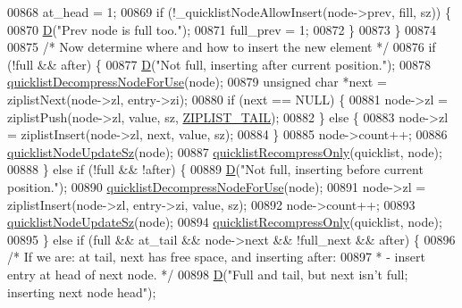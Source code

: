 \begin{DoxyCode}
{{{{{00868         at\_head = 1;
00869         \textcolor{keywordflow}{if} (!\_quicklistNodeAllowInsert(node->prev, fill, sz)) \{
00870             \hyperlink{debugmacro_8h_a74021f021dcdfbb22891787b79c5529d}{D}(\textcolor{stringliteral}{"Prev node is full too."});
00871             full\_prev = 1;
00872         \}
00873     \}
00874 
00875     \textcolor{comment}{/* Now determine where and how to insert the new element */}
00876     \textcolor{keywordflow}{if} (!full && after) \{
00877         \hyperlink{debugmacro_8h_a74021f021dcdfbb22891787b79c5529d}{D}(\textcolor{stringliteral}{"Not full, inserting after current position."});
00878         \hyperlink{quicklist_8c_a2f30e6f482d51059f06fa34df69734e1}{quicklistDecompressNodeForUse}(node);
00879         \textcolor{keywordtype}{unsigned} \textcolor{keywordtype}{char} *next = ziplistNext(node->zl, entry->zi);
00880         \textcolor{keywordflow}{if} (next == NULL) \{
00881             node->zl = ziplistPush(node->zl, value, sz, \hyperlink{ziplist_8h_a25d058a2c2c0db0f131f84d23ede6ba2}{ZIPLIST\_TAIL});
00882         \} \textcolor{keywordflow}{else} \{
00883             node->zl = ziplistInsert(node->zl, next, value, sz);
00884         \}
00885         node->count++;
00886         \hyperlink{quicklist_8c_a03a3947a9423d234923343702619c553}{quicklistNodeUpdateSz}(node);
00887         \hyperlink{quicklist_8c_a75672a682e90fe973934910f3ee866a3}{quicklistRecompressOnly}(quicklist, node);
00888     \} \textcolor{keywordflow}{else} \textcolor{keywordflow}{if} (!full && !after) \{
00889         \hyperlink{debugmacro_8h_a74021f021dcdfbb22891787b79c5529d}{D}(\textcolor{stringliteral}{"Not full, inserting before current position."});
00890         \hyperlink{quicklist_8c_a2f30e6f482d51059f06fa34df69734e1}{quicklistDecompressNodeForUse}(node);
00891         node->zl = ziplistInsert(node->zl, entry->zi, value, sz);
00892         node->count++;
00893         \hyperlink{quicklist_8c_a03a3947a9423d234923343702619c553}{quicklistNodeUpdateSz}(node);
00894         \hyperlink{quicklist_8c_a75672a682e90fe973934910f3ee866a3}{quicklistRecompressOnly}(quicklist, node);
00895     \} \textcolor{keywordflow}{else} \textcolor{keywordflow}{if} (full && at\_tail && node->next && !full\_next && after) \{
00896         \textcolor{comment}{/* If we are: at tail, next has free space, and inserting after:}
00897 \textcolor{comment}{         *   - insert entry at head of next node. */}
00898         \hyperlink{debugmacro_8h_a74021f021dcdfbb22891787b79c5529d}{D}(\textcolor{stringliteral}{"Full and tail, but next isn't full; inserting next node head"});
}}}}}
\end{DoxyCode}
